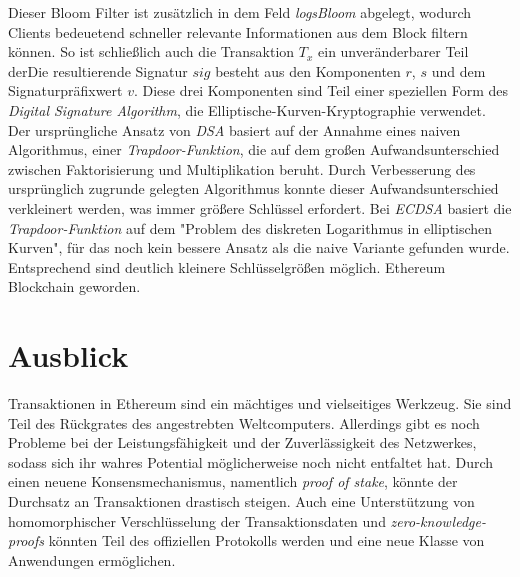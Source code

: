 \documentclass[runningheads]{llncs}
\begin{document}
Dieser Bloom Filter ist zusätzlich in dem Feld \textit{logsBloom} abgelegt, wodurch Clients bedeuetend schneller relevante Informationen aus dem Block filtern können. \cite[S. 5]{wood_ethereum_nodate} So ist schließlich auch die Transaktion $ T_x $ ein unveränderbarer Teil derDie resultierende Signatur $ sig $ besteht aus den Komponenten $ r $, $ s $ und dem Signaturpräfixwert $ v $.  Diese drei Komponenten sind Teil einer speziellen Form des \textit{Digital Signature Algorithm}, die Elliptische-Kurven-Kryptographie verwendet. Der ursprüngliche Ansatz von \textit{DSA} basiert auf der Annahme eines naiven Algorithmus, einer \textit{Trapdoor-Funktion}, die auf dem großen Aufwandsunterschied zwischen Faktorisierung und Multiplikation beruht. Durch Verbesserung des ursprünglich zugrunde gelegten Algorithmus konnte dieser Aufwandsunterschied verkleinert werden, was immer größere Schlüssel erfordert. Bei \textit{ECDSA} basiert die \textit{Trapdoor-Funktion} auf dem "Problem des diskreten Logarithmus in elliptischen Kurven", für das noch kein bessere Ansatz als die naive Variante gefunden wurde. Entsprechend sind deutlich kleinere Schlüsselgrößen möglich. \cite{noauthor_elliptic_2020} Ethereum Blockchain geworden.

\section{Ausblick}
Transaktionen in Ethereum sind ein mächtiges und vielseitiges Werkzeug. Sie sind Teil des Rückgrates des angestrebten Weltcomputers. Allerdings gibt es noch Probleme bei der Leistungsfähigkeit und der Zuverlässigkeit des Netzwerkes, sodass sich ihr wahres Potential möglicherweise noch nicht entfaltet hat. Durch einen neuene Konsensmechanismus, namentlich \textit{proof of stake}, könnte der Durchsatz an Transaktionen drastisch steigen. Auch eine Unterstützung von homomorphischer Verschlüsselung der Transaktionsdaten und \textit{zero-knowledge-proofs} könnten Teil des offiziellen Protokolls werden und eine neue Klasse von Anwendungen ermöglichen.



\end{document}
